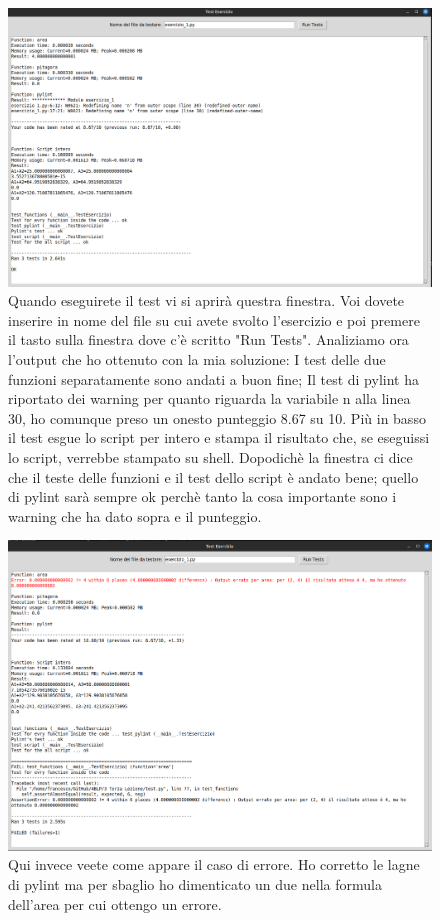 \documentclass[10pt,a4paper]{article}
\begin{document}
\FloatBarrier
\begin{figure}
\centering
\includegraphics[scale=0.25]{img/ese_test.png}
\caption{Quando eseguirete il test vi si aprirà questra finestra. Voi dovete inserire in nome del file su cui avete svolto l'esercizio e poi premere il tasto sulla finestra dove c'è scritto "Run Tests". Analiziamo ora l'output che ho ottenuto con la mia soluzione: I test delle due funzioni separatamente sono andati a buon fine; Il test di pylint ha riportato dei warning per quanto riguarda la variabile n alla linea 30, ho comunque preso un onesto punteggio 8.67 su 10. Più in basso il test esgue lo script per intero e stampa il risultato che, se eseguissi lo script, verrebbe stampato su shell. Dopodichè la finestra ci dice che il teste delle funzioni e il test dello script è andato bene; quello di pylint sarà sempre ok perchè tanto la cosa importante sono i warning che ha dato sopra e il punteggio.}
\end{figure}
\FloatBarrier
\FloatBarrier
\begin{figure}
\centering
\includegraphics[scale=0.25]{img/ese_test_2.png}
\caption{Qui invece veete come appare il caso di errore. Ho corretto le lagne di pylint ma per sbaglio ho dimenticato un due nella formula dell'area per cui ottengo un errore.}
\end{figure}
\end{document}
